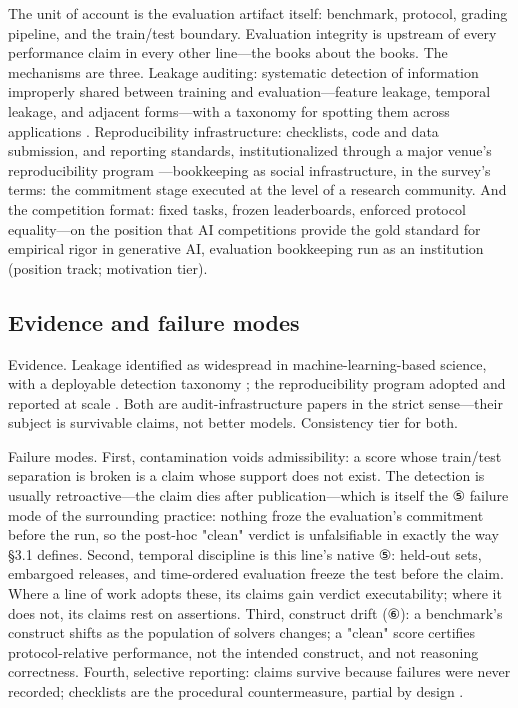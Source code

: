\documentclass[11pt,a4paper]{article}
\begin{document}
The unit of account is the evaluation artifact itself: benchmark, protocol, grading pipeline, and the train/test boundary. Evaluation integrity is upstream of every performance claim in every other line—the books about the books. The mechanisms are three. Leakage auditing: systematic detection of information improperly shared between training and evaluation—feature leakage, temporal leakage, and adjacent forms—with a taxonomy for spotting them across applications \cite{key07}. Reproducibility infrastructure: checklists, code and data submission, and reporting standards, institutionalized through a major venue's reproducibility program \cite{key08}—bookkeeping as social infrastructure, in the survey's terms: the commitment stage executed at the level of a research community. And the competition format: fixed tasks, frozen leaderboards, enforced protocol equality—on the position that AI competitions provide the gold standard for empirical rigor in generative AI, evaluation bookkeeping run as an institution \cite{key31} (position track; motivation tier).

\subsection{Evidence and failure modes}

Evidence. Leakage identified as widespread in machine-learning-based science, with a deployable detection taxonomy \cite{key07}; the reproducibility program adopted and reported at scale \cite{key08}. Both are audit-infrastructure papers in the strict sense—their subject is survivable claims, not better models. Consistency tier for both.

Failure modes. First, contamination voids admissibility: a score whose train/test separation is broken is a claim whose support does not exist. The detection is usually retroactive—the claim dies after publication—which is itself the ⑤ failure mode of the surrounding practice: nothing froze the evaluation's commitment before the run, so the post-hoc "clean" verdict is unfalsifiable in exactly the way §3.1 defines. Second, temporal discipline is this line's native ⑤: held-out sets, embargoed releases, and time-ordered evaluation freeze the test before the claim. Where a line of work adopts these, its claims gain verdict executability; where it does not, its claims rest on assertions. Third, construct drift (⑥): a benchmark's construct shifts as the population of solvers changes; a "clean" score certifies protocol-relative performance, not the intended construct, and not reasoning correctness. Fourth, selective reporting: claims survive because failures were never recorded; checklists are the procedural countermeasure, partial by design \cite{key08}.
\end{document}
